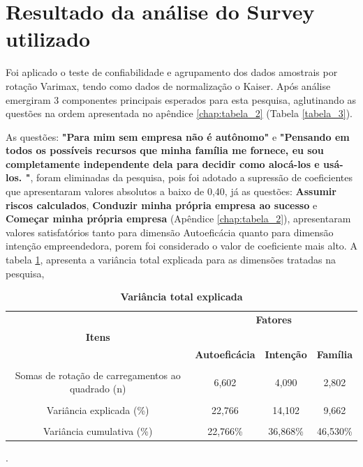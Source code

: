 \section{Resultado da análise do Survey utilizado}

Foi aplicado o teste de confiabilidade e agrupamento dos dados amostrais por rotação Varimax, tendo como dados de normalização o Kaiser\footnotemark[1]. 
Após análise  emergiram 3 componentes principais esperados para esta pesquisa, aglutinando as questões na ordem apresentada no apêndice \ref{chap:tabela_2} (Tabela \ref{tabela_3}).


As questões: \textbf{"Para mim sem empresa não é autônomo"} e \textbf{"Pensando em todos os possíveis recursos que minha família me fornece, eu sou completamente independente dela para decidir como alocá-los e usá-los.			
"}, foram eliminadas da pesquisa, pois foi adotado a supressão de coeficientes que apresentaram valores absolutos a baixo de 0,40, já as questões: \textbf{Assumir riscos calculados}, \textbf{Conduzir minha própria empresa ao sucesso} e \textbf{Começar minha própria empresa} (Apêndice \ref{chap:tabela_2}), apresentaram valores satisfatórios tanto para dimensão Autoeficácia quanto para dimensão intenção empreendedora, porem foi considerado o valor de coeficiente mais alto. 
A tabela \ref{tab:tabela_4}, apresenta a variância total explicada para as dimensões tratadas na pesquisa,  


\begin{table}[H]
 \centering
\caption{\textbf{Variância total explicada}}
\label{tab:tabela_4}
\hline\hline
\begin{tabular}{c c c c }
\multicolumn{1}{p{6cm}}{} & \multicolumn{3}{c}{\textbf{Fatores}}\\ 
 \multicolumn{1}{c}{\textbf{Itens}} & \multicolumn{3}{c}{\hrulefill}\\ 

 \multicolumn{1}{c}{} 
 &\multicolumn{1}{c}{\textbf{Autoeficácia}} & \multicolumn{1}{c}{\textbf{Intenção}} &\multicolumn{1}{c}{\textbf{Família}}  
\\\\ \hline 

 Somas de rotação de carregamentos ao quadrado (n)
 & 6,602 & 4,090 & 2,802 \\\\
 Variância explicada (\%)
 & 22,766 & 14,102 & 9,662\\\\
 Variância cumulativa (\%)
 & 22,766\% & 36,868\% & 46,530\% \\\hline \hline 
\end{tabular}
.
\end{table}


